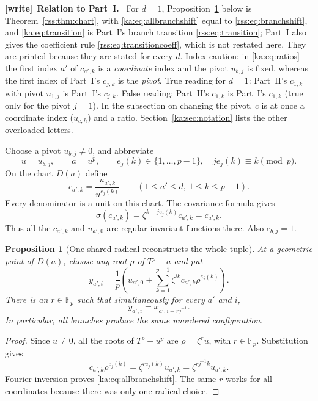 \documentclass[11pt,a4paper]{article}
\newtheorem{proposition}[theorem]{Proposition}
\theoremstyle{definition}
\theoremstyle{remark}
\newcommand{\F}{\mathbb F}
\newenvironment{writenote}[1][]{\par\smallskip\begingroup\small
 \noindent\textbf{[write]}\if\relax\detokenize{#1}\relax\else~\textbf{#1.}\fi\ }%
 {\par\endgroup\smallskip}
\begin{document}
\begin{writenote}[Relation to Part~I]
For $d=1$, Proposition~\ref{ka:prop:branches} below is
Theorem~\ref{rss:thm:chart}, with \eqref{ka:eq:allbranchshift} equal to
\eqref{rss:eq:branchshift}, and \eqref{ka:eq:transition} is Part~I's branch
transition \eqref{rss:eq:transition}; Part~I also gives the coefficient rule
\eqref{rss:eq:transitioncoeff}, which is not restated here. They are printed
because they are stated for every $d$. Index caution: in \eqref{ka:eq:ratios}
the first index $a'$ of $c_{a',k}$ is a \emph{coordinate} index and the pivot
$u_{b,j}$ is fixed, whereas the first index of Part~I's $c_{j,k}$ is the
\emph{pivot}. True reading for $d=1$: Part~II's $c_{1,k}$ with pivot $u_{1,j}$
is Part~I's $c_{j,k}$. False reading: Part~II's $c_{1,k}$ is Part~I's
$c_{1,k}$ (true only for the pivot $j=1$). In the subsection on changing the
pivot, $c$ is at once a coordinate index ($u_{c,h}$) and a ratio.
Section~\ref{ka:sec:notation} lists the other overloaded letters.
\end{writenote}

Choose a pivot $u_{b,j}\neq0$, and abbreviate
\[
 u=u_{b,j},\qquad a=u^p,\qquad e_j(k)\in\{1,\ldots,p-1\},
 \quad j e_j(k)\equiv k\pmod p.
\]
On the chart $D(a)$ define
\begin{equation}
 c_{a',k}=\frac{u_{a',k}}{u^{e_j(k)}}
 \qquad (1\leq a'\leq d,\ 1\leq k\leq p-1).
 \label{ka:eq:ratios}
\end{equation}
Every denominator is a unit on this chart. The covariance formula gives
\[
 \sigma(c_{a',k})=\zeta^{k-j e_j(k)}c_{a',k}=c_{a',k}.
\]
Thus all the $c_{a',k}$ and $u_{a',0}$ are regular invariant functions
there. Also $c_{b,j}=1$.

\begin{proposition}[One shared radical reconstructs the whole tuple]
\label{ka:prop:branches}
At a geometric point of $D(a)$, choose any root $\rho$ of $T^p-a$ and put
\begin{equation}
 y_{a',i}=\frac1p\left(u_{a',0}+
       \sum_{k=1}^{p-1}\zeta^{ik}c_{a',k}\rho^{e_j(k)}\right).
 \label{ka:eq:reconstruct}
\end{equation}
There is an $r\in\F_p$ such that simultaneously for every $a'$ and $i$,
\begin{equation}
 y_{a',i}=x_{a',i+rj^{-1}}.
 \label{ka:eq:allbranchshift}
\end{equation}
In particular, all branches produce the same unordered configuration.
\end{proposition}
\begin{proof}
Since $u\neq0$, all the roots of $T^p-u^p$ are
$\rho=\zeta^r u$, with $r\in\F_p$. Substitution gives
\[
 c_{a',k}\rho^{e_j(k)}
 =\zeta^{r e_j(k)}u_{a',k}
 =\zeta^{rj^{-1}k}u_{a',k}.
\]
Fourier inversion proves \eqref{ka:eq:allbranchshift}. The same $r$ works
for all coordinates because there was only one radical choice.
\end{proof}
\end{document}
